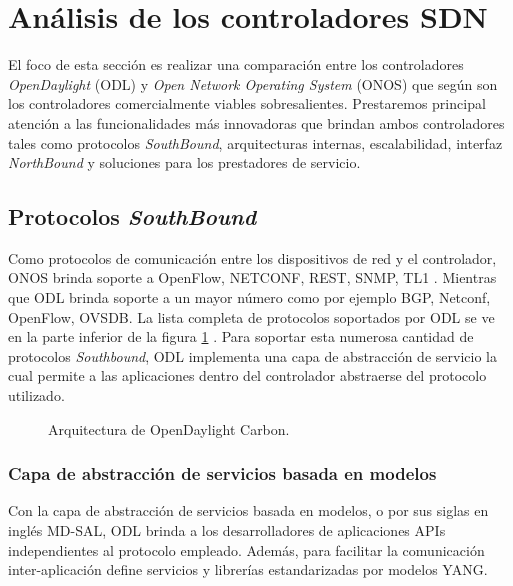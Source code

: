 
\section{Análisis de los controladores SDN} \label{AnalisisControladoresSDN}
El foco de esta sección es realizar una comparación entre los controladores \textit{OpenDaylight} (ODL) y \textit{Open Network Operating System} (ONOS) que según \parencite{book_SDN_a_c_a} son los controladores comercialmente viables sobresalientes. Prestaremos principal atención a las funcionalidades más innovadoras que brindan ambos controladores tales como protocolos \textit{SouthBound}, arquitecturas internas, escalabilidad, interfaz \textit{NorthBound} y soluciones para los prestadores de servicio.

\subsection{Protocolos \textit{SouthBound}}

Como protocolos de comunicación entre los dispositivos de red y el controlador, ONOS brinda soporte a OpenFlow, NETCONF, REST, SNMP, TL1 \parencite{onosSouthboundProtocols}. Mientras que ODL brinda soporte a un mayor número como por ejemplo BGP, Netconf, OpenFlow, OVSDB. La lista completa de protocolos soportados por ODL se ve en la parte inferior de la figura \ref{fig:ODLCarbon} \parencite{odlSouthboundProtocols}. Para soportar esta numerosa cantidad de protocolos \textit{Southbound}, ODL implementa una capa de abstracción de servicio la cual permite a las aplicaciones dentro del controlador abstraerse del protocolo utilizado.  


\begin{figure}[th]
	\centering 
	\caption[Arquitectura de OpenDaylight Carbon]{Arquitectura de OpenDaylight Carbon. \parencite{odlarch}}
	\label{fig:ODLCarbon}
\end{figure}

\subsubsection*{Capa de abstracción de servicios basada en modelos}

Con la capa de abstracción de servicios basada en modelos, o por sus siglas en inglés MD-SAL, ODL brinda a los desarrolladores de aplicaciones APIs independientes al protocolo empleado. Además, para facilitar la comunicación inter-aplicación define servicios y librerías estandarizadas por modelos YANG.    

